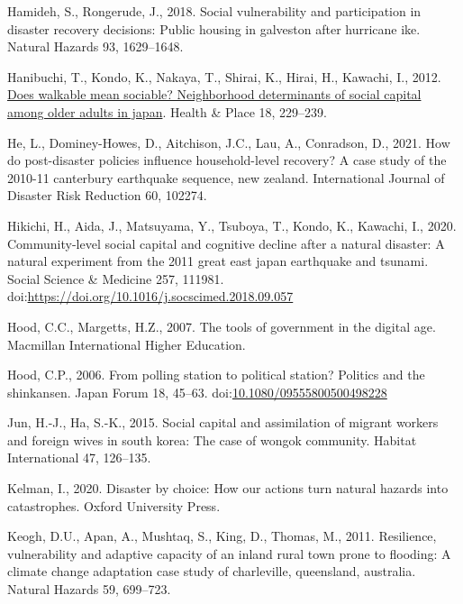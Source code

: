 \documentclass[]{elsarticle} %
\newlength{\cslhangindent}
\newlength{\cslentryspacingunit} %
\newenvironment{CSLReferences}[2] %
 {%
  \setlength{\parindent}{0pt}
  \ifodd #1
  \let\oldpar\par
  \def\par{\hangindent=\cslhangindent\oldpar}
  \fi
  \setlength{\parskip}{#2\cslentryspacingunit}
 }%
 {}
\begin{document}
\begin{CSLReferences}{1}{0}
\leavevmode{}%
Hamideh, S., Rongerude, J., 2018. Social vulnerability and participation
in disaster recovery decisions: Public housing in galveston after
hurricane ike. Natural Hazards 93, 1629--1648.

\leavevmode{}%
Hanibuchi, T., Kondo, K., Nakaya, T., Shirai, K., Hirai, H., Kawachi,
I., 2012. \href{https://doi.org/10.1016/j.healthplace.2011.09.015}{Does
walkable mean sociable? Neighborhood determinants of social capital
among older adults in japan}. Health \& Place 18, 229--239.

\leavevmode{}%
He, L., Dominey-Howes, D., Aitchison, J.C., Lau, A., Conradson, D.,
2021. How do post-disaster policies influence household-level recovery?
A case study of the 2010-11 canterbury earthquake sequence, new zealand.
International Journal of Disaster Risk Reduction 60, 102274.

\leavevmode{}%
Hikichi, H., Aida, J., Matsuyama, Y., Tsuboya, T., Kondo, K., Kawachi,
I., 2020. Community-level social capital and cognitive decline after a
natural disaster: A natural experiment from the 2011 great east japan
earthquake and tsunami. Social Science \& Medicine 257, 111981.
doi:\url{https://doi.org/10.1016/j.socscimed.2018.09.057}

\leavevmode{}%
Hood, C.C., Margetts, H.Z., 2007. The tools of government in the digital
age. Macmillan International Higher Education.

\leavevmode{}%
Hood, C.P., 2006. From polling station to political station? Politics
and the shinkansen. Japan Forum 18, 45--63.
doi:\href{https://doi.org/10.1080/09555800500498228}{10.1080/09555800500498228}

\leavevmode{}%
Jun, H.-J., Ha, S.-K., 2015. Social capital and assimilation of migrant
workers and foreign wives in south korea: The case of wongok community.
Habitat International 47, 126--135.

\leavevmode{}%
Kelman, I., 2020. Disaster by choice: How our actions turn natural
hazards into catastrophes. Oxford University Press.

\leavevmode{}%
Keogh, D.U., Apan, A., Mushtaq, S., King, D., Thomas, M., 2011.
Resilience, vulnerability and adaptive capacity of an inland rural town
prone to flooding: A climate change adaptation case study of
charleville, queensland, australia. Natural Hazards 59, 699--723.


\end{CSLReferences}
\end{document}
